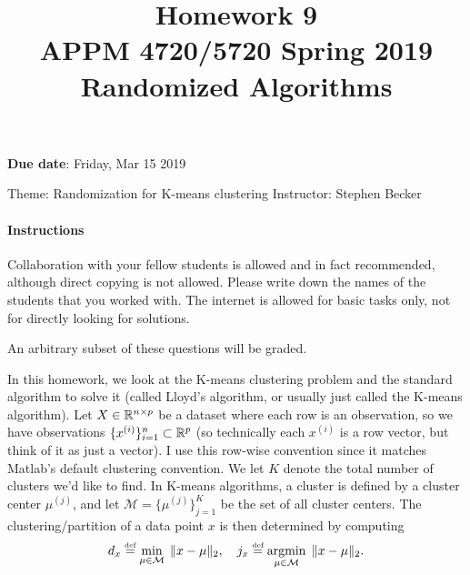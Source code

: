 \documentclass[10pt, letterpaper]{scrartcl}
\title{Homework 9 \solTitle{Selected Solutions} \\APPM 4720/5720 Spring 2019 \\ Randomized Algorithms}
\date{}
\newenvironment{instructions}{}{}
\begin{document}
\maketitle
\vspace{-6em}
\textbf{Due date}: Friday, Mar 15 2019

Theme: Randomization for K-means clustering   \hfill Instructor: Stephen Becker %

\begin{instructions}
\paragraph{Instructions}
Collaboration with your fellow students is allowed and in fact recommended, although direct copying is not allowed.  Please write down the names of the students that you worked with. The internet is allowed for basic tasks only, not for directly looking for solutions.

An arbitrary subset of these questions will be graded.

%
%
\end{instructions}


\renewcommand{\xi}{x^{(i)}}
\newcommand{\xj}{x^{(j)}}
\newcommand{\muj}{\mu^{(j)}}
\newcommand{\M}{\mathcal{M}}
\vspace{2ex}
In this homework, we look at the K-means clustering problem and the standard algorithm to solve it (called Lloyd's algorithm, or usually just called the K-means algorithm).
Let $X \in \mathbb{R}^{n \times p}$ be a dataset where each row is an observation, so we have observations $\{ \xi \}_{i=1}^n \subset \R^p$ (so technically each $\xi$ is a  row vector,
but think of it as just a vector). I use this row-wise convention since it matches Matlab's default clustering convention. We let $K$ denote the total number of clusters we'd like to find. In K-means algorithms, a cluster is defined by a cluster center $\muj$, and let $\M = \{\muj\}_{j=1}^K$ be the set of all cluster centers. The clustering/partition of a data point $x$ is then determined by computing
\begin{equation}\label{eq:assignment}
d_x \defeq \min_{ \mu \in\M } \; \|x-\mu\|_2, \quad
j_x \defeq \argmin_{ \mu \in\M } \; \|x-\mu\|_2.
\end{equation}
\end{document}
